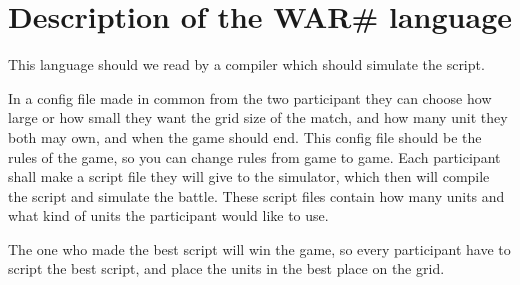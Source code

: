 
\section{ Description of the WAR\# language }

	This language should we read by a compiler which should simulate the script.
	
	In a config file made in common from the two participant they can choose how large or how small 
	they want the grid size of the match, and how many unit 	
	they both may own, and when the game should end. 
	This config file should be the rules of the game, 
	so you can change rules from game to game.
	Each participant shall make a script file they will give to the simulator, 
	which then will compile the script and simulate the battle. 
	These script files contain how many units and what kind of units the participant would like to use.

	The one who made the best script will win the game, so every participant have to script the best script, 
	and place the units in the best place on the grid.


